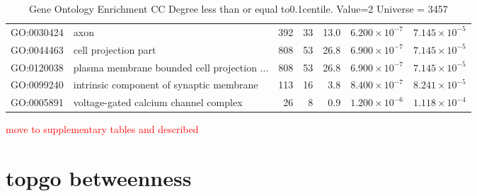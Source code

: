\begin{table}[ht]
\begin{adjustbox}{max width=\textwidth}
\begin{tabular}{llrrrrr}
  GO:0030424 & axon & 392 & 33 & 13.0 & $6.200 \times 10^{-7}$ & $7.145 \times 10^{-5}$ \\ 
  GO:0044463 & cell projection part & 808 & 53 & 26.8 & $6.900 \times 10^{-7}$ & $7.145 \times 10^{-5}$ \\ 
  GO:0120038 & plasma membrane bounded cell projection ... & 808 & 53 & 26.8 & $6.900 \times 10^{-7}$ & $7.145 \times 10^{-5}$ \\ 
  GO:0099240 & intrinsic component of synaptic membrane & 113 & 16 & 3.8 & $8.400 \times 10^{-7}$ & $8.241 \times 10^{-5}$ \\ 
  GO:0005891 & voltage-gated calcium channel complex & 26 & 8 & 0.9 & $1.200 \times 10^{-6}$ & $1.118 \times 10^{-4}$ \\ 
   \hline
\end{tabular}
\end{adjustbox}
\caption{Gene Ontology Enrichment CC Degree  less than or equal to0.1centile.   Value=2 Universe = 3457} 
\label{tab:Gene Ontology Enrichment CC Degree  less than or equal to0.1centile.   Value=2 Universe = 3457}
\end{table}
\textcolor{red}{move to supplementary tables and described}


\section{topgo betweenness}

